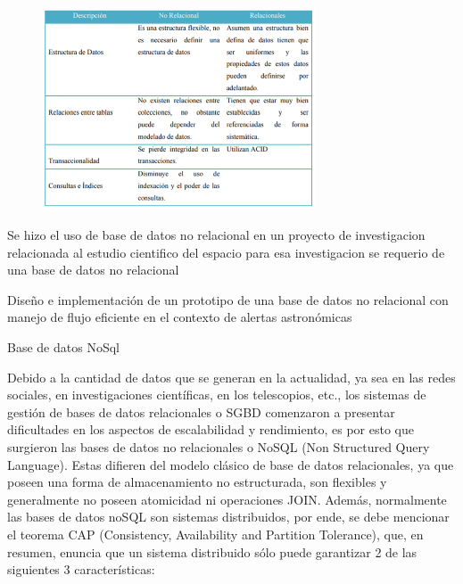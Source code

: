 \documentclass[12pt]{article}
\begin{document}
\begin{multicols}{2}
\begin{figure}[H]
	\begin{Center}
		\includegraphics[width=3.19in,height=2.37in]{./media/image6.png}
	\end{Center}
\end{figure}



\par

{\fontsize{9pt}{10.8pt}\selectfont  \par}\par

{\fontsize{9pt}{10.8pt}\selectfont Se hizo el uso de base de datos no relacional en un proyecto de investigacion relacionada al estudio cientifico del espacio para esa investigacion se requerio de una base de datos no relacional\par}\par

{\fontsize{9pt}{10.8pt}\selectfont Diseño e implementación de un prototipo de una base de datos no relacional con manejo de flujo eficiente en el contexto de alertas astronómicas\par}\par

{\fontsize{9pt}{10.8pt}\selectfont Base de datos NoSql\par}\par

{\fontsize{9pt}{10.8pt}\selectfont Debido a la cantidad de datos que se generan en la actualidad, ya sea en las redes sociales, en investigaciones científicas, en los telescopios, etc., los sistemas de gestión de bases de datos relacionales o SGBD comenzaron a presentar dificultades en los aspectos de escalabilidad y rendimiento, es por esto que surgieron las bases de datos no relacionales o NoSQL (Non Structured Query Language). Estas difieren del modelo clásico de base de datos relacionales, ya que poseen una forma de almacenamiento no estructurada, son flexibles y generalmente no poseen atomicidad ni operaciones JOIN. Además, normalmente las bases de datos noSQL son sistemas distribuidos, por ende, se debe mencionar el teorema CAP (Consistency, Availability and Partition Tolerance), que, en resumen, enuncia que un sistema distribuido sólo puede garantizar 2 de las siguientes 3 características:\par}\par


\end{multicols}
\end{document}
